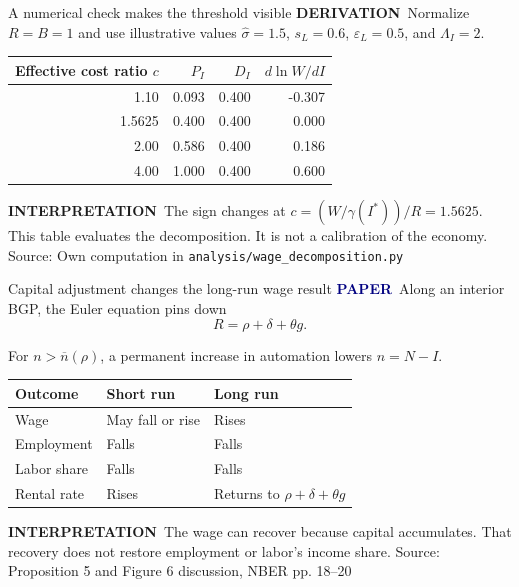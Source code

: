 \documentclass[aspectratio=169,11pt]{beamer}
\newcommand{\source}[1]{\vfill{\tiny\color{muted}Source: #1}}
\newcommand{\paper}{\textcolor{navy}{\textbf{PAPER}}}
\newcommand{\derivation}{\textcolor{rust}{\textbf{DERIVATION}}}
\newcommand{\interpretation}{\textcolor{muted}{\textbf{INTERPRETATION}}}
\begin{document}
\begin{frame}{A numerical check makes the threshold visible}
  \derivation\ Normalize $R=B=1$ and use illustrative values
  $\widehat\sigma=1.5$, $s_L=0.6$, $\varepsilon_L=0.5$, and $\Lambda_I=2$.

  \medskip
  \centering
  \begin{tabular}{rrrr}
    \toprule
    Effective cost ratio $c$ & $P_I$ & $D_I$ & $d\ln W/dI$ \\
    \midrule
    1.10 & 0.093 & 0.400 & -0.307 \\
    1.5625 & 0.400 & 0.400 & 0.000 \\
    2.00 & 0.586 & 0.400 & 0.186 \\
    4.00 & 1.000 & 0.400 & 0.600 \\
    \bottomrule
  \end{tabular}

  \medskip
  \raggedright
  \interpretation\ The sign changes at $c=(W/\gamma(I^*))/R=1.5625$. This table evaluates the decomposition. It is not a calibration of the economy.
  \source{Own computation in \texttt{analysis/wage\_decomposition.py}}
\end{frame}

\begin{frame}{Capital adjustment changes the long-run wage result}
  \paper\ Along an interior BGP, the Euler equation pins down
  \[
    R=\rho+\delta+\theta g.
  \]

  For $n>\overline n(\rho)$, a permanent increase in automation lowers $n=N-I$.

  \medskip
  \begin{tabular}{>{\raggedright\arraybackslash}p{}p{}p{}}
    \toprule
    Outcome & Short run & Long run \\
    \midrule
    Wage & May fall or rise & Rises \\
    Employment & Falls & Falls \\
    Labor share & Falls & Falls \\
    Rental rate & Rises & Returns to $\rho+\delta+\theta g$ \\
    \bottomrule
  \end{tabular}

  \interpretation\ The wage can recover because capital accumulates. That recovery does not restore employment or labor's income share.
  \source{Proposition 5 and Figure 6 discussion, NBER pp. 18--20}
\end{frame}
\end{document}
